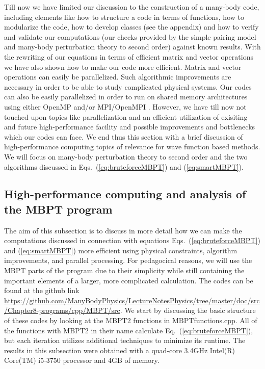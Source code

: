 Till now we have limited our discussion to the construction of a
many-body code, including elements like how to structure a code in
terms of functions, how to modularize the code, how to develop classes
(see the appendix) and how to verify and validate our computations
(our checks provided by the simple pairing model and many-body
perturbation theory to second order) against known results.  With the
rewriting of our equations in terms of efficient matrix and vector
operations we have also shown how to make our code more efficient.
Matrix and vector operations can easily be parallelized. Such
algorithmic improvements are necessary in order to be able to study
complicated physical systems.  Our codes can also be easily parallelized in order to run on shared memory architectures using either OpenMP \cite{openmp} and/or MPI/OpenMPI \cite{mpi,openmpi}.
However, we have till now not touched
upon topics like parallelization and an efficient utilization of exisiting and future
high-performance facility and possible improvements and bottlenecks which our codes can face. We end thus this section with a brief discussion
of high-performance computing topics of relevance for wave function based methods. We will focus on many-body perturbation theory to second order and the two algorithms discussed in Eqs.~(\ref{eq:bruteforceMBPT}) and (\ref{eq:smartMBPT}). 


\subsection{High-performance computing and analysis of the MBPT program}
The aim of this subsection is to discuss in more detail how we can make the computations discussed in connection with equations 
Eqs.~(\ref{eq:bruteforceMBPT}) and (\ref{eq:smartMBPT}) more efficient using physical constraints, algorithm improvements, and parallel processing. For pedagocical reasons, we will use the MBPT parts of the program due to their simplicity while still containing the important elements of a larger, more complicated calculation. 
The codes can be found at the github link 
\url{https://github.com/ManyBodyPhysics/LectureNotesPhysics/tree/master/doc/src/Chapter8-programs/cpp/MBPT/src}.
We start by discussing the basic structure of these codes by looking at the MBPT2 functions in MBPTfunctions.cpp.
All of the functions with MBPT2 in their name calculate Eq.~(\ref{eq:bruteforceMBPT}), but each iteration utilizes additional techniques to minimize its runtime. The results in this subsection were obtained with a quad-core 3.4GHz Intel(R) Core(TM) i5-3750 processor and 4GB of memory.

